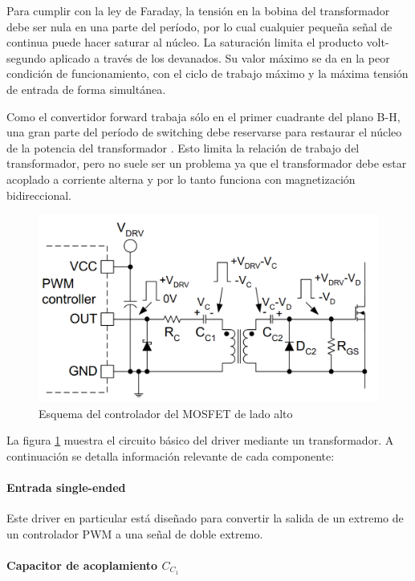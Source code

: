 Para cumplir con la ley de Faraday, la tensión en la bobina del transformador debe ser nula en una parte del período, 
por lo cual cualquier pequeña señal de continua puede hacer saturar al núcleo. 
La saturación limita el producto volt-segundo aplicado a través de los devanados. 
Su valor máximo se da en la peor condición de funcionamiento, con el ciclo de trabajo máximo y la máxima tensión de entrada de forma simultánea. 

Como el convertidor forward trabaja sólo en el primer cuadrante del plano B-H, una gran parte del período de switching debe reservarse para restaurar el núcleo de la potencia del transformador \cite{hart_espanol}.
Esto limita la relación de trabajo del transformador, pero no suele ser un problema ya que 
el transformador debe estar acoplado a corriente alterna y por lo tanto funciona con magnetización bidireccional.

\begin{figure}[H]
    \centering
    \includegraphics[width=\textwidth]{images/esquema_driver.png}
    \caption{Esquema del controlador del MOSFET de lado alto}
    \label{fig:driver}
\end{figure}

La figura \ref{fig:driver} muestra el circuito básico del driver mediante un transformador.
A continuación se detalla información relevante de cada componente: 

\paragraph{Entrada single-ended} 

Este driver en particular está diseñado para convertir la salida de un extremo de un controlador PWM a una señal de doble extremo. %

\paragraph{Capacitor de acoplamiento $C_{C_1}$}

